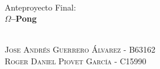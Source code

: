 \begin{titlepage}

\HRule \\[0.2cm]
{ \large Anteproyecto Final: \\[0.5cm] 
\Large \bfseries $\Omega$--Pong}\\[0.4cm]
\HRule \\[2cm]
 

\begin{minipage}{0.6\textwidth}
\begin{center}
\textsc{Jose Andrés Guerrero Álvarez - B63162}\\
\textsc{Roger Daniel Piovet García - C15990}\\

\end{center}
\end{minipage}\\[2cm]



\vfill %

\end{titlepage}

\newpage
